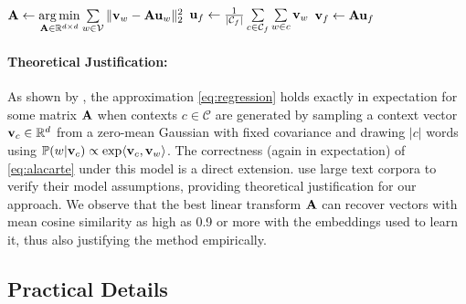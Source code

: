 \documentclass[11pt,a4paper]{article}
\DeclareMathOperator*{\argmin}{arg\,min}
\begin{document}
\begin{algorithm*}[!t]
	\DontPrintSemicolon
	${\bf A}\gets\argmin\limits_{{\bf A}\in\mathbb{R}^{d\times d}}\sum\limits_{w\in\mathcal{V}}\|{\bf v}_w-{\bf Au}_w\|_2^2$ 
	${\bf u}_f\gets\frac{1}{|\mathcal{C}_f|}\sum\limits_{c\in\mathcal{C}_f}\sum\limits_{w\in c}{\bf v}_w$ 
	${\bf v}_f\gets{\bf Au}_f$ 
	\caption{\label{alg:induction}
		The basic {\em\`a la carte} feature embedding induction method. All contexts $c$ consist of sequences of words drawn from the vocabulary $\mathcal{V}$.
	}
\end{algorithm*}

\paragraph{Theoretical Justification:}
As shown by \citet[Theorem~1]{Arora:18b}, the approximation \eqref{eq:regression} holds exactly in expectation for some matrix ${\bf A}$ when contexts $c\in\mathcal{C}$ are generated by sampling a context vector ${\bf v}_c\in\mathbb{R}^d$ from a zero-mean Gaussian with fixed covariance and drawing $|c|$ words using $\mathbb{P}(w|{\bf v}_c)\propto\exp\langle{\bf v}_c,{\bf v}_w\rangle$.
The correctness (again in expectation) of \eqref{eq:alacarte} under this model is a direct extension.
\citet{Arora:18b} use large text corpora to verify their model assumptions, providing theoretical justification for our approach. 
We observe that the best linear transform ${\bf A}$ can recover vectors with mean cosine similarity as high as 0.9 or more with the embeddings used to learn it, thus also justifying the method empirically.

\subsection{Practical Details}\label{subsec:details}
\end{document}
